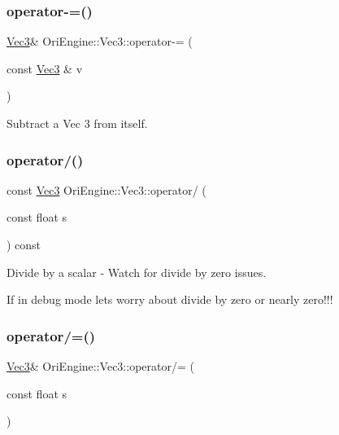 \subsubsection{\texorpdfstring{operator-\/=()}{operator-=()}}
{\footnotesize\ttfamily \hyperlink{struct_ori_engine_1_1_vec3}{Vec3}\& Ori\+Engine\+::\+Vec3\+::operator-\/= (\begin{DoxyParamCaption}\item[{const \hyperlink{struct_ori_engine_1_1_vec3}{Vec3} \&}]{v }\end{DoxyParamCaption})\hspace{0.3cm}{\ttfamily [inline]}}



Subtract a Vec 3 from itself. 

\hypertarget{struct_ori_engine_1_1_vec3_ae3a5cf75e250a543b1045be44b954950}{}\label{struct_ori_engine_1_1_vec3_ae3a5cf75e250a543b1045be44b954950} 
\subsubsection{\texorpdfstring{operator/()}{operator/()}}
{\footnotesize\ttfamily const \hyperlink{struct_ori_engine_1_1_vec3}{Vec3} Ori\+Engine\+::\+Vec3\+::operator/ (\begin{DoxyParamCaption}\item[{const float}]{s }\end{DoxyParamCaption}) const\hspace{0.3cm}{\ttfamily [inline]}}



Divide by a scalar -\/ Watch for divide by zero issues. 

If in debug mode let\textquotesingle{}s worry about divide by zero or nearly zero!!! \hypertarget{struct_ori_engine_1_1_vec3_a8931b41bd47e616624c49320bd83e959}{}\label{struct_ori_engine_1_1_vec3_a8931b41bd47e616624c49320bd83e959} 
\subsubsection{\texorpdfstring{operator/=()}{operator/=()}}
{\footnotesize\ttfamily \hyperlink{struct_ori_engine_1_1_vec3}{Vec3}\& Ori\+Engine\+::\+Vec3\+::operator/= (\begin{DoxyParamCaption}\item[{const float}]{s }\end{DoxyParamCaption})\hspace{0.3cm}{\ttfamily [inline]}}

